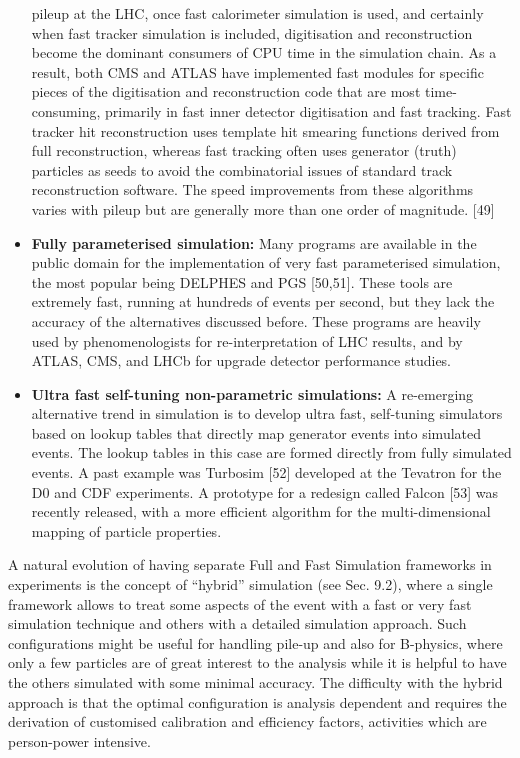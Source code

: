 \documentclass[12pt,a4paper]{article}
\begin{document}
\begin{itemize}
  pileup at the LHC, once fast calorimeter simulation is used, and
  certainly when fast tracker simulation is included, digitisation and
  reconstruction become the dominant consumers of CPU time in the
  simulation chain. As a result, both CMS and ATLAS have implemented
  fast modules for specific pieces of the digitisation and
  reconstruction code that are most time-consuming, primarily in fast
  inner detector digitisation and fast tracking. Fast tracker hit
  reconstruction uses template hit smearing functions derived from full
  reconstruction, whereas fast tracking often uses generator (truth)
  particles as seeds to avoid the combinatorial issues of standard track
  reconstruction software. The speed improvements from these algorithms
  varies with pileup but are generally more than one order of magnitude.
  {[}49{]}
\item
  \textbf{Fully parameterised simulation:} Many programs are available
  in the public domain for the implementation of very fast parameterised
  simulation, the most popular being DELPHES and PGS {[}50,51{]}. These
  tools are extremely fast, running at hundreds of events per second,
  but they lack the accuracy of the alternatives discussed before. These
  programs are heavily used by phenomenologists for re-interpretation of
  LHC results, and by ATLAS, CMS, and LHCb for upgrade detector
  performance studies.
\item
  \textbf{Ultra fast self-tuning non-parametric simulations:} A
  re-emerging alternative trend in simulation is to develop ultra fast,
  self-tuning simulators based on lookup tables that directly map
  generator events into simulated events. The lookup tables in this case
  are formed directly from fully simulated events. A past example was
  Turbosim {[}52{]} developed at the Tevatron for the D0 and CDF
  experiments. A prototype for a redesign called Falcon {[}53{]} was
  recently released, with a more efficient algorithm for the
  multi-dimensional mapping of particle properties.
\end{itemize}

A natural evolution of having separate Full and Fast Simulation
frameworks in experiments is the concept of ``hybrid'' simulation (see
Sec. 9.2), where a single framework allows to treat some aspects of the
event with a fast or very fast simulation technique and others with a
detailed simulation approach. Such configurations might be useful for
handling pile-up and also for B-physics, where only a few particles are
of great interest to the analysis while it is helpful to have the others
simulated with some minimal accuracy. The difficulty with the hybrid
approach is that the optimal configuration is analysis dependent and
requires the derivation of customised calibration and efficiency
factors, activities which are person-power intensive.
\end{document}
